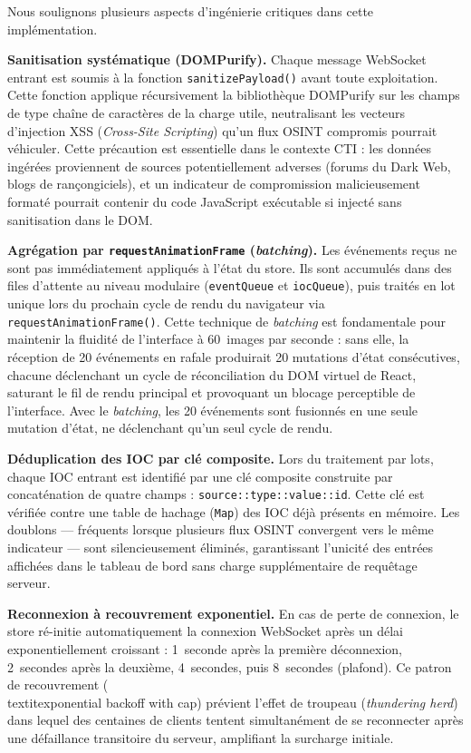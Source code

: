 Nous soulignons plusieurs aspects d'ingénierie critiques dans cette implémentation.

\textbf{Sanitisation systématique (DOMPurify).} Chaque message WebSocket entrant est soumis à la fonction \texttt{sanitizePayload()} avant toute exploitation. Cette fonction applique récursivement la bibliothèque DOMPurify sur les champs de type chaîne de caractères de la charge utile, neutralisant les vecteurs d'injection XSS (\textit{Cross-Site Scripting}) qu'un flux OSINT compromis pourrait véhiculer. Cette précaution est essentielle dans le contexte CTI : les données ingérées proviennent de sources potentiellement adverses (forums du Dark Web, blogs de rançongiciels), et un indicateur de compromission malicieusement formaté pourrait contenir du code JavaScript exécutable si injecté sans sanitisation dans le DOM.

\textbf{Agrégation par \texttt{requestAnimationFrame} (\textit{batching}).} Les événements reçus ne sont pas immédiatement appliqués à l'état du store. Ils sont accumulés dans des files d'attente au niveau modulaire (\texttt{eventQueue} et \texttt{iocQueue}), puis traités en lot unique lors du prochain cycle de rendu du navigateur via \texttt{requestAnimationFrame()}. Cette technique de \textit{batching} est fondamentale pour maintenir la fluidité de l'interface à 60~images par seconde : sans elle, la réception de 20 événements en rafale produirait 20 mutations d'état consécutives, chacune déclenchant un cycle de réconciliation du DOM virtuel de React, saturant le fil de rendu principal et provoquant un blocage perceptible de l'interface. Avec le \textit{batching}, les 20 événements sont fusionnés en une seule mutation d'état, ne déclenchant qu'un seul cycle de rendu.

\textbf{Déduplication des IOC par clé composite.} Lors du traitement par lots, chaque IOC entrant est identifié par une clé composite construite par concaténation de quatre champs : \texttt{source::type::value::id}. Cette clé est vérifiée contre une table de hachage (\texttt{Map}) des IOC déjà présents en mémoire. Les doublons --- fréquents lorsque plusieurs flux OSINT convergent vers le même indicateur --- sont silencieusement éliminés, garantissant l'unicité des entrées affichées dans le tableau de bord sans charge supplémentaire de requêtage serveur.

\textbf{Reconnexion à recouvrement exponentiel.} En cas de perte de connexion, le store ré-initie automatiquement la connexion WebSocket après un délai exponentiellement croissant : 1~seconde après la première déconnexion, 2~secondes après la deuxième, 4~secondes, puis 8~secondes (plafond). Ce patron de recouvrement (\\textit{exponential backoff with cap}) prévient l'effet de troupeau (\textit{thundering herd}) dans lequel des centaines de clients tentent simultanément de se reconnecter après une défaillance transitoire du serveur, amplifiant la surcharge initiale.


